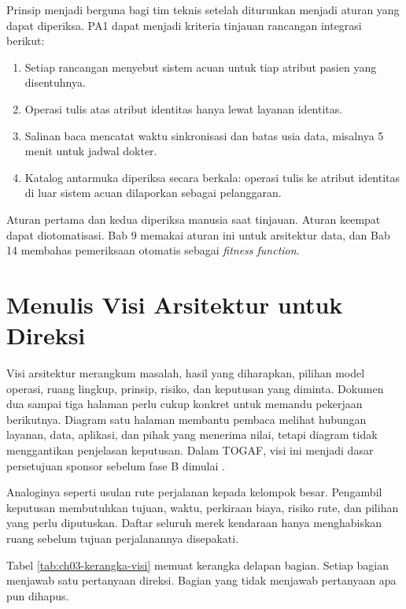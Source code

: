 \begin{pendalaman}[title={Pendalaman Teknis (opsional): Dari Prinsip ke Aturan Desain}]
  Prinsip menjadi berguna bagi tim teknis setelah diturunkan menjadi aturan yang
  dapat diperiksa. PA1 dapat menjadi kriteria tinjauan rancangan integrasi berikut:

  \begin{enumerate}
    \item Setiap rancangan menyebut sistem acuan untuk tiap atribut pasien yang
          disentuhnya.
    \item Operasi tulis atas atribut identitas hanya lewat layanan identitas.
    \item Salinan baca mencatat waktu sinkronisasi dan batas usia data, misalnya 5
          menit untuk jadwal dokter.
    \item Katalog antarmuka diperiksa secara berkala: operasi tulis ke atribut
          identitas di luar sistem acuan dilaporkan sebagai pelanggaran.
  \end{enumerate}

  Aturan pertama dan kedua diperiksa manusia saat tinjauan. Aturan keempat dapat
  diotomatisasi. Bab 9 memakai aturan ini untuk arsitektur data, dan Bab 14 membahas
  pemeriksaan otomatis sebagai \textit{fitness function}.
\end{pendalaman}

\section{Menulis Visi Arsitektur untuk Direksi}

Visi arsitektur merangkum masalah, hasil yang diharapkan, pilihan model operasi,
ruang lingkup, prinsip, risiko, dan keputusan yang diminta. Dokumen dua sampai tiga
halaman perlu cukup konkret untuk memandu pekerjaan berikutnya. Diagram satu halaman
membantu pembaca melihat hubungan layanan, data, aplikasi, dan pihak yang menerima
nilai, tetapi diagram tidak menggantikan penjelasan keputusan. Dalam TOGAF, visi ini
menjadi dasar persetujuan sponsor sebelum fase B dimulai \cite{togaf10}.

Analoginya seperti usulan rute perjalanan kepada kelompok besar. Pengambil keputusan
membutuhkan tujuan, waktu, perkiraan biaya, risiko rute, dan pilihan yang perlu
diputuskan. Daftar seluruh merek kendaraan hanya menghabiskan ruang sebelum tujuan
perjalanannya disepakati.

Tabel \ref{tab:ch03-kerangka-visi} memuat kerangka delapan bagian. Setiap bagian
menjawab satu pertanyaan direksi. Bagian yang tidak menjawab pertanyaan apa pun
dihapus.


